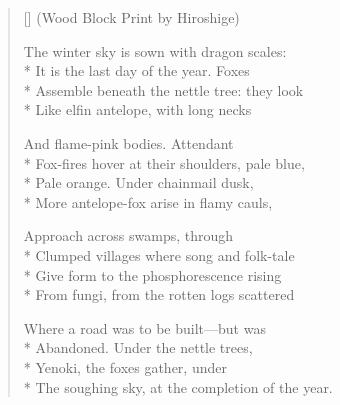 \label{ch:magic_foxes}
\settowidth{\versewidth}{The soughing sky, at the completion of the year.}
\begin{verse}[\versewidth]
      (Wood Block Print by Hiroshige)

The winter sky is sown with dragon scales:\\*
It is the last day of the year. \qquad  Foxes\\*
Assemble beneath the nettle tree:  they look\\*
Like elfin antelope, with long necks

And flame-pink bodies. \qquad Attendant\\*
Fox-fires hover at their shoulders, pale blue,\\*
Pale orange.  Under chainmail dusk,\\*
More antelope-fox arise in flamy cauls,

Approach across swamps, through \\*
Clumped villages where song and folk-tale\\*
Give form to the phosphorescence rising\\*
From fungi, from the rotten logs scattered

Where a road was to be built---but was\\*
Abandoned.  Under the nettle trees,\\*
Yenoki, the foxes gather, under\\*
The soughing sky, at the completion of the year.
\end{verse}
